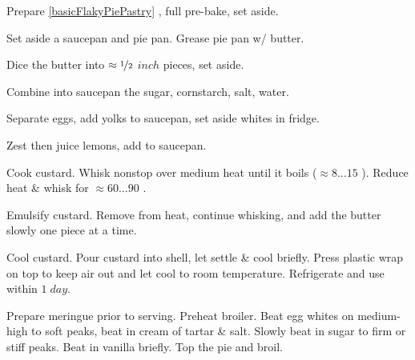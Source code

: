 \begin{preparation}
\item Prepare \ref{basicFlakyPiePastry} , full pre-bake, set aside.

\item Set aside a saucepan and pie pan.
	Grease pie pan w/ butter.

\item Dice the butter into $\approx\nicefrac{1}{2}$ $inch$ pieces, set aside.

\item Combine into saucepan the sugar, cornstarch, salt, water.

\item Separate eggs, add yolks to saucepan, set aside whites in fridge.

\item Zest then juice lemons, add to saucepan.

\item Cook custard.
	Whisk nonstop over medium heat until it boils ($\approx 8\dots15$ \minute).
	Reduce heat \& whisk for $\approx 60 \dots 90$ \second.

\item Emulsify custard.
	Remove from heat, continue whisking, and add the butter slowly one piece at a time.

\item Cool custard.
	Pour custard into shell, let settle \& cool briefly.
	Press plastic wrap on top to keep air out and let cool to room temperature.
	Refrigerate and use within $1\; day$.

\item Prepare meringue prior to serving.
	Preheat broiler.
	Beat egg whites on medium-high to soft peaks, beat in cream of tartar \& salt.
	Slowly beat in sugar to firm or stiff peaks.
	Beat in vanilla briefly. Top the pie and broil.
\end{preparation}


\recipeend
